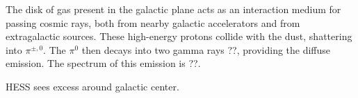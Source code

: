 The disk of gas present in the galactic plane acts as an interaction medium for passing cosmic rays, both from nearby galactic accelerators and from extragalactic sources.
These high-energy protons collide with the dust, shattering into $\pi^{\pm,0}$.
The $\pi^0$ then decays into two gamma rays ??, providing the diffuse emission.
The spectrum of this emission is ??.

HESS sees excess around galactic center.


